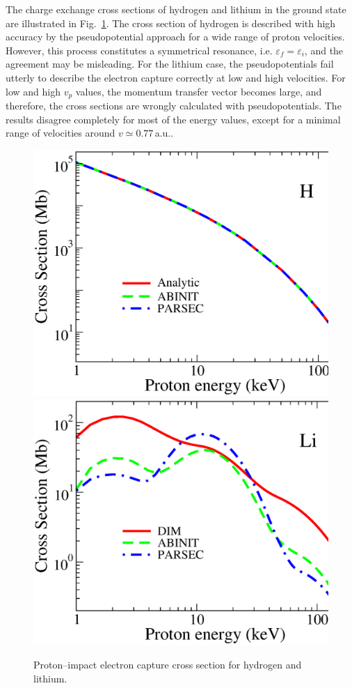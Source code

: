 \documentclass[10pt]{article}
\begin{document}
The charge exchange cross sections of hydrogen and lithium in the 
ground state are illustrated in Fig.~\ref{fig:captureH}. The cross 
section of hydrogen is described with high accuracy by the 
pseudopotential approach for a wide range of proton velocities. 
However, this process constitutes 
a symmetrical resonance, i.e. $\varepsilon_{\!f}=\varepsilon_{\!i}$, 
and the agreement may be misleading. For the lithium case, the 
pseudopotentials fail utterly to describe the electron capture 
correctly at low and high velocities. For low and high $v_p$ values, the 
momentum transfer vector becomes large, and therefore, the cross 
sections are wrongly calculated with pseudopotentials. 
The results disagree completely for most of the energy values, except
for a minimal range of velocities around $v\simeq0.77$\,a.u..
\begin{figure}[H]
\centering
 \includegraphics[height=0.23\textheight]{figures/pseudopot/captureH.eps}
 \hspace{0.3cm}
 \includegraphics[height=0.23\textheight]{figures/pseudopot/captureLi.eps}
 \caption{Proton--impact electron capture cross section for hydrogen and 
 lithium.}
 \label{fig:captureH}
\end{figure}
\end{document}
